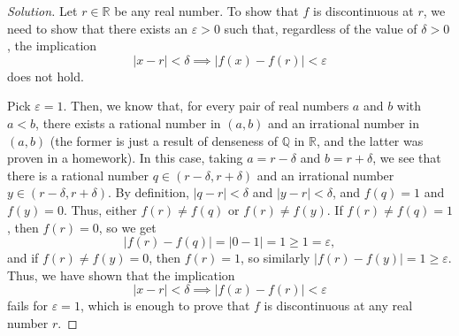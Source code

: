 \documentclass[11pt]{scrartcl}
\providecommand{\eps}{\varepsilon}
\providecommand{\QQ}{\mathbb Q}
\providecommand{\RR}{\mathbb R}
\theoremstyle{problem}
\theoremstyle{remark}
\newenvironment{soln}{\begin{proof}[Solution]}{\end{proof}}
\begin{document}
\begin{soln}
	Let $r\in\RR$ be any real number. To show that $f$ is discontinuous at $r$,
	we need to show that there exists an $\eps > 0$ such that,
	regardless of the value of $\delta > 0$, the implication
	\[|x - r| < \delta \implies |f(x) - f(r)| < \eps\]
	does not hold.
	
	Pick $\eps = 1$. Then, we know that, for every pair of real numbers
	$a$ and $b$ with $a < b$, there exists a rational number in $(a, b)$
	and an irrational number in $(a, b)$
	(the former is just a result of denseness of $\QQ$ in $\RR$,
	and the latter was proven in a homework).
	In this case, taking $a = r - \delta$ and $b = r + \delta$,
	we see that there is a rational number $q\in(r - \delta, r + \delta)$
	and an irrational number $y\in(r - \delta, r + \delta)$.
	By definition, $|q - r| < \delta$ and $|y - r| < \delta$,
	and $f(q) = 1$ and $f(y) = 0$. Thus, either $f(r) \ne f(q)$
	or $f(r) \ne f(y)$. If $f(r)\ne f(q) = 1$, then $f(r) = 0$, so we get
	\[|f(r) - f(q)| = |0 - 1| = 1 \ge 1 = \eps,\]
	and if $f(r) \ne f(y) = 0$, then $f(r) = 1$,
	so similarly $|f(r) - f(y)| = 1 \ge \eps$.
	Thus, we have shown that the implication
	\[|x - r| < \delta \implies |f(x) - f(r)| < \eps\]
	fails for $\eps = 1$, which is enough to prove that
	$f$ is discontinuous at any real number $r$.
\end{soln}
\end{document}

